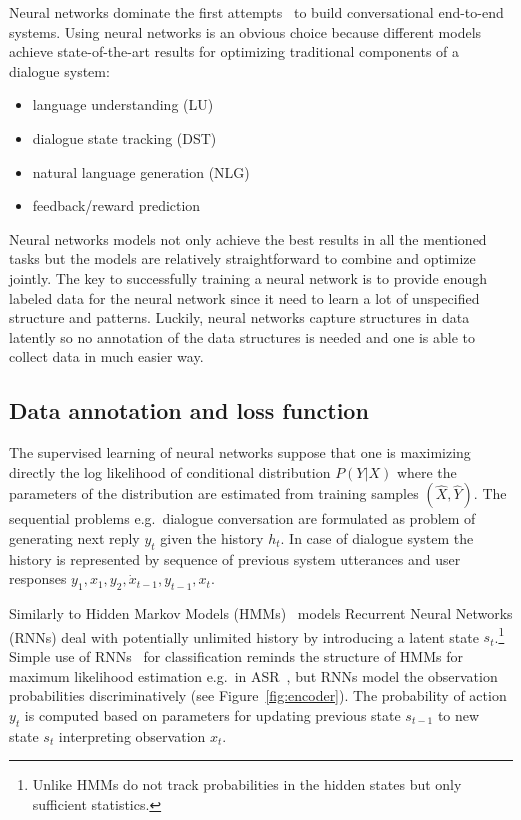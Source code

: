\documentclass[11pt]{article}
\begin{document}
Neural networks dominate the first attempts~\cite{williams2016end,bordes_learning_2016,weston2015endtoend_prereq} to build conversational end-to-end systems.
Using neural networks is an obvious choice because different models achieve state-of-the-art results for optimizing traditional components of a dialogue system:
\begin{itemize}
    \item language understanding (LU) \cite{mairesse_spoken_2009} 
    \item dialogue state tracking (DST) \cite{williams_web-style_2014,henderson2014word,vodolan_hybrid_2015,platek_recurrent_2016}
    \item natural language generation (NLG) \cite{dusek_sequence2sequence_2016,wen_networkbased_2016}
    \item feedback/reward prediction~\cite{su_learning_2015}
\end{itemize}
Neural networks models not only achieve the best results in all the mentioned tasks but the models are relatively straightforward to combine and optimize jointly.
The key to successfully training a neural network is to provide enough labeled data for the neural network since it need to learn a lot of unspecified structure and patterns.
Luckily, neural networks capture structures in data latently so no annotation of the data structures is needed and one is able to collect data in much easier way.

\subsection{Data annotation and loss function}
\label{sub:data_annotation}

The supervised learning of neural networks suppose that one is maximizing directly the log likelihood of conditional distribution $ P(Y| X) $ where the parameters of the distribution are estimated from training samples $ (\hat{X}, \hat{Y}) $.
The sequential problems e.g.\ dialogue conversation are formulated as problem of generating next reply $y_t$ given the history $h_t$.
In case of dialogue system the history is represented by sequence of previous system utterances and user responses $ y_1, x_1, y_2, \dot x_{t-1}, y_{t-1}, x_t $.

Similarly to Hidden Markov Models (HMMs)~\cite{huang_hidden_1990} models Recurrent Neural Networks (RNNs) deal with potentially unlimited history by introducing a latent state $s_t$.\footnote{Unlike HMMs do not track probabilities in the hidden states but only sufficient statistics.}
Simple use of  RNNs~\cite{gers_learning_2000} for classification reminds the structure of HMMs for maximum likelihood estimation e.g.\ in ASR~\cite{huang_hidden_1990}, but RNNs model the observation probabilities discriminatively (see Figure~\ref{fig:encoder}).
The probability of action $ y_t $ is computed based on parameters for updating previous state $s_{t-1}$ to new state $s_t$ interpreting observation $x_t$.
\end{document}
